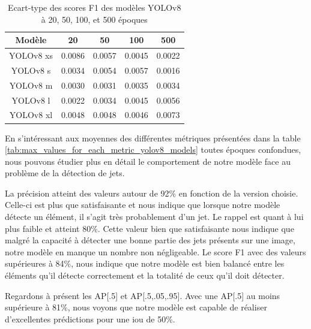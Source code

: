 \begin{table}[!ht]
    \caption{Ecart-type des scores F1 des modèles YOLOv8 à 20, 50, 100, et 500 époques}
    \label{tab:std_f1_scores_yolov8_models}
    \centering
    \begin{tabular}{ |c||c|c|c|c|  }
        \hline
        \rowcolor{gray!50}
        Modèle & 20 & 50 & 100 & 500\\
        \hline
        YOLOv8 xs & 0.0086 & 0.0057 & 0.0045 & 0.0022\\
        YOLOv8 s & 0.0034 & 0.0054 & 0.0057 & 0.0016\\
        YOLOv8 m & 0.0030 & 0.0031 & 0.0035 & 0.0034\\
        YOLOv8 l & 0.0022 & 0.0034 & 0.0045 & 0.0056\\
        YOLOv8 xl & 0.0048 & 0.0048 & 0.0046 & 0.0073\\
        \hline
    \end{tabular}
\end{table}

En s'intéressant aux moyennes des différentes métriques présentées dans la table \ref{tab:max_values_for_each_metric_yolov8_models} toutes époques confondues, nous pouvons étudier plus en détail le comportement de notre modèle face au problème de la détection de jets.

La précision atteint des valeurs autour de 92\% en fonction de la version choisie. Celle-ci est plus que satisfaisante et nous indique que lorsque notre modèle détecte un élément, il s'agit très probablement d'un jet. Le rappel est quant à lui plus faible et atteint 80\%. Cette valeur bien que satisfaisante nous indique que malgré la capacité à détecter une bonne partie des jets présents sur une image, notre modèle en manque un nombre non négligeable. Le score F1 avec des valeurs supérieures à 84\%, nous indique que notre modèle est bien balancé entre les éléments qu'il détecte correctement et la totalité de ceux qu'il doit détecter.

Regardons à présent les AP[.5] et AP[.5,.05,.95]. Avec une AP[.5] au moins supérieure à 81\%, nous voyons que notre modèle est capable de réaliser d'excellentes prédictions pour une \acrshort{iou} de 50\%.

